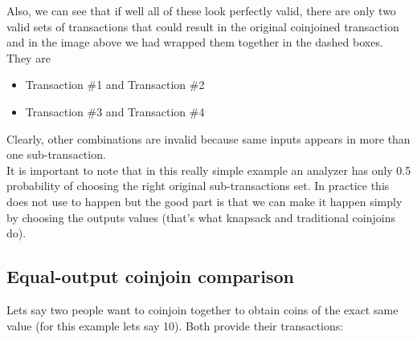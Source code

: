 \documentclass[10pt]{article}
\begin{document}
\begin{center}
\end{center}

Also, we can see that if well all of these look perfectly valid, there are only two valid sets of transactions that could result in the original coinjoined transaction and in the image above we had wrapped them together in the dashed boxes. They are

\begin{itemize}
  \item Transaction \#1 and Transaction \#2
  \item Transaction \#3 and Transaction \#4
\end{itemize}


Clearly, other combinations are invalid because same inputs appears in more than one sub-transaction.\\

It is important to note that in this really simple example an analyzer has only 0.5 probability of choosing the right original sub-transactions set. In practice this does not use to happen but the good part is that we can make it happen simply by choosing the outputs values (that's what knapsack and traditional coinjoins do).

\subsection{Equal-output coinjoin comparison}

Lets say two people want to coinjoin together to obtain coins of the exact same value (for this example lets say 10). Both provide their transactions:
\end{document}
